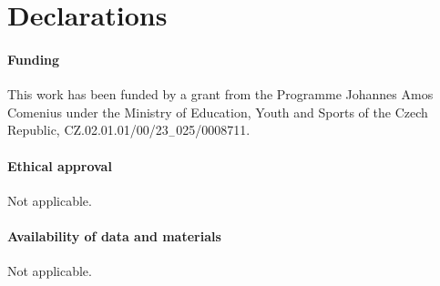 \documentclass[reqno]{amsart}
\theoremstyle{plain}
\theoremstyle{definition}
\begin{document}
\section*{Declarations}
\paragraph{\textbf{Funding}}
This work has been funded by a grant from the Programme Johannes Amos Comenius
under the Ministry of Education, Youth and Sports of the Czech Republic,
CZ.02.01.01/00/23$_{-}$025/0008711. 
\paragraph{\textbf{Ethical approval}}
Not applicable. 

\paragraph{\textbf{Availability of data and materials}}
Not applicable. 
\end{document}
